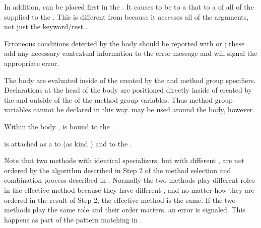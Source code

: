 In addition,   can be placed first in the 
.  It causes  to be  to a 
that  to a  of all of the  supplied
to the .  This is different from  because it
accesses all of the arguments, not just the keyword/rest .


Erroneous conditions detected by the body should be reported with
 or ; these
add any necessary contextual information to the error message and will
signal the appropriate error.
                                                        
The body  are evaluated inside of the  created by
the
 and method group specifiers. 
Declarations at the head of
the body are positioned directly inside of  created by the
 and outside of the  of the method group variables. 
Thus method group variables cannot be declared in this way.   may be used
around the body, however.
 
Within the body , 
is bound to the  .

 is attached as a  
    to  (as kind )
and to the  .
 
 
 
Note that two methods with identical specializers, but with different
, are not ordered by the algorithm described in Step 2 of
the method selection and combination process described in 
\secref\MethodSelectionAndCombination.  Normally the two methods play
different roles in the effective method because they have different
, and no matter how they are ordered in the result of Step
2, the effective method is the same.  If the two methods play the same
role and their order matters, 
an error is signaled.  This happens as
part of the  pattern matching in
.

